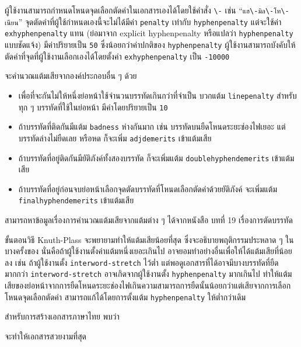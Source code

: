 ผู้ใช้งานสามารถกำหนดโหนดจุดเลือกตัดคำในเอกสารเองได้โดยใช้คำสั่ง
\texttt{\textbackslash -} เช่น
\enquote{\texttt{แฮ\textbackslash -มิล\textbackslash -โท\textbackslash -เนียน}}
จุดตัดคำที่ผู้ใช้กำหนดเองนี้จะไม่ได้มีค่า \texttt{penalty} เท่ากับ
\texttt{hyphenpenalty} แต่จะใช้ค่า \texttt{exhyphenpenalty} แทน (ย่อมาจาก
explicit hyphenpenalty หรือแปลว่า \texttt{hyphenpenalty} แบบชัดแจ้ง)
มีค่าปริยายเป็น \texttt{50} ซึ่งน้อยกว่าค่าปกติของ \texttt{hyphenpenalty}
ผู้ใช้งานสามารถบังคับให้ \texlogo ตัดคำที่จุดที่ผู้ใช้งานเลือกเองได้โดยตั้งค่า
\texttt{exhyphenpenalty} เป็น \texttt{-10000}

\texlogo จะคำนวณแต้มเสียจากองค์ประกอบอื่น ๆ ด้วย
\begin{itemize}
  \item เพื่อที่จะกันไม่ให้หนึ่งย่อหน้าใช้จำนวนบรรทัดเกินกว่าที่จำเป็น \texlogo
        บวกแต้ม \texttt{linepenalty} สำหรับทุก ๆ บรรทัดที่ใช้ในย่อหน้า
        มีค่าโดยปริยายเป็น
        \texttt{10}
  \item ถ้าบรรทัดที่ติดกันมีแต้ม \texttt{badness} ห่างกันมาก เช่น
        บรรทัดบนยืดโหนดระยะช่องไฟเยอะ แต่บรรทัดล่างไม่ยืดเลย หรือหด \texlogo
        ก็จะเพิ่ม \texttt{adjdemerits} เข้าแต้มเสีย
  \item ถ้าบรรทัดที่อยู่ติดกันมียัติภังค์ทั้งสองบรรทัด ก็จะเพิ่มแต้ม
        \texttt{doublehyphendemerits} เข้าแต้มเสีย
  \item ถ้าบรรทัดที่อยู่ก่อนจบย่อหน้าเลือกจุดตัดบรรทัดที่โหนดเลือกตัดคำด้วยยัติภังค์
        จะเพิ่มแต้ม \texttt{finalhyphendemerits} เข้าแต้มเสีย
\end{itemize}
สามารถหาข้อมูลเรื่องการคำนวณแต้มเสียจากแต้มต่าง ๆ ได้จากหนังสือ
 บทที่ 19 เรื่องการตัดบรรทัด \parencite{texbytopic}

ขั้นตอนวิธี Knuth-Plass จะพยายามทำให้แต้มเสียน้อยที่สุด
ซึ่งจะอธิบายพฤติกรรมประหลาด ๆ ในบางครั้งของ \texlogo
นั่นคือถ้าผู้ใช้งานตั้งค่าแต้มหนึ่งเยอะเกินไป \texlogo
อาจยอมทำอย่างอื่นเพื่อให้ได้แต้มเสียที่น้อยลง เช่น ถ้าผู้ใช้งานตั้ง
\texttt{interword-stretch} ไว้ต่ำ แต่พอดูเอกสารที่ได้อาจมีบางบรรทัดที่ยืดมากกว่า
\texttt{interword-stretch} อาจเกิดจากผู้ใช้งานตั้ง \texttt{hyphenpenalty}
มากเกินไป
ทำให้แต้มเสียของย่อหน้าจากการยืดโหนดระยะช่องไฟเกินความสามารถการยืดนั้นน้อยกว่าแต่เสียจากการเลือกโหนดจุดเลือกตัดคำ
สามารถแก้ได้โดยการตั้งแต้ม \texttt{hyphenpenalty} ให้ต่ำกว่าเดิม

สำหรับการสร้างเอกสารภาษาไทย พบว่า
\begin{texsource}{}
\end{texsource}
จะทำให้เอกสารสวยงามที่สุด

